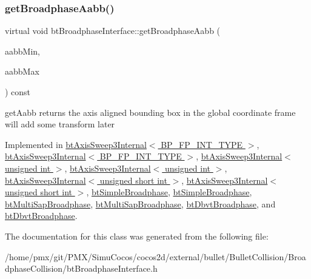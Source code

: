 \mbox{\label{classbtBroadphaseInterface_ab5af9e26414f5a72a76040b8fab4d9e2}} 
\subsubsection{\texorpdfstring{get\+Broadphase\+Aabb()}{getBroadphaseAabb()}\hspace{0.1cm}{\footnotesize\ttfamily [2/2]}}
{\footnotesize\ttfamily virtual void bt\+Broadphase\+Interface\+::get\+Broadphase\+Aabb (\begin{DoxyParamCaption}\item[{bt\+Vector3 \&}]{aabb\+Min,  }\item[{bt\+Vector3 \&}]{aabb\+Max }\end{DoxyParamCaption}) const\hspace{0.3cm}{\ttfamily [pure virtual]}}

get\+Aabb returns the axis aligned bounding box in the \textquotesingle{}global\textquotesingle{} coordinate frame will add some transform later 

Implemented in \hyperlink{classbtAxisSweep3Internal_ad1e0037e1ed62ef5049389bb4e8fd5b5}{bt\+Axis\+Sweep3\+Internal$<$ B\+P\+\_\+\+F\+P\+\_\+\+I\+N\+T\+\_\+\+T\+Y\+P\+E $>$}, \hyperlink{classbtAxisSweep3Internal_ad1e0037e1ed62ef5049389bb4e8fd5b5}{bt\+Axis\+Sweep3\+Internal$<$ B\+P\+\_\+\+F\+P\+\_\+\+I\+N\+T\+\_\+\+T\+Y\+P\+E $>$}, \hyperlink{classbtAxisSweep3Internal_ad1e0037e1ed62ef5049389bb4e8fd5b5}{bt\+Axis\+Sweep3\+Internal$<$ unsigned int $>$}, \hyperlink{classbtAxisSweep3Internal_ad1e0037e1ed62ef5049389bb4e8fd5b5}{bt\+Axis\+Sweep3\+Internal$<$ unsigned int $>$}, \hyperlink{classbtAxisSweep3Internal_ad1e0037e1ed62ef5049389bb4e8fd5b5}{bt\+Axis\+Sweep3\+Internal$<$ unsigned short int $>$}, \hyperlink{classbtAxisSweep3Internal_ad1e0037e1ed62ef5049389bb4e8fd5b5}{bt\+Axis\+Sweep3\+Internal$<$ unsigned short int $>$}, \hyperlink{classbtSimpleBroadphase_a4e8e5de5df6d3125631e3d94a67ac4d2}{bt\+Simple\+Broadphase}, \hyperlink{classbtSimpleBroadphase_a4e8e5de5df6d3125631e3d94a67ac4d2}{bt\+Simple\+Broadphase}, \hyperlink{classbtMultiSapBroadphase_a37a11b7ee2889d80adaf5add6fffe782}{bt\+Multi\+Sap\+Broadphase}, \hyperlink{classbtMultiSapBroadphase_a37a11b7ee2889d80adaf5add6fffe782}{bt\+Multi\+Sap\+Broadphase}, \hyperlink{structbtDbvtBroadphase_acbd595a9434b6bb045e15ab0d36120e3}{bt\+Dbvt\+Broadphase}, and \hyperlink{structbtDbvtBroadphase_ab546a1950f0f0f30dcc897b35e656e0b}{bt\+Dbvt\+Broadphase}.



The documentation for this class was generated from the following file\+:\begin{DoxyCompactItemize}
\item 
/home/pmx/git/\+P\+M\+X/\+Simu\+Cocos/cocos2d/external/bullet/\+Bullet\+Collision/\+Broadphase\+Collision/bt\+Broadphase\+Interface.\+h\end{DoxyCompactItemize}
